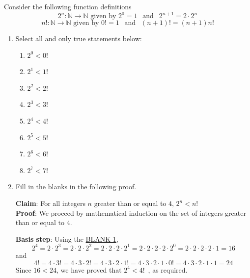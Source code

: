 \documentclass[12pt, oneside]{article}
\begin{document}
\begin{enumerate}
Consider the following function definitions
\[
    2^n: \mathbb{N} \to \mathbb{N} \text{ given by } 2^0 = 1 ~~\text{ and }~~
    2^{n+1} = 2 \cdot 2^n  
\]
\[
    n!: \mathbb{N} \to \mathbb{N} \text{ given by } 0! = 1 ~~\text{ and }~~
    (n+1)! = (n+1) n!
\]
\begin{enumerate}
\item Select all and only true statements below: 
    \begin{enumerate}
        \item $2^0 < 0!$
        \item $2^1 < 1!$
        \item $2^2 < 2!$
        \item $2^3 < 3!$
        \item $2^4 < 4!$
        \item $2^5 < 5!$
        \item $2^6 < 6!$
        \item $2^7 < 7!$
    \end{enumerate}

\item Fill in the blanks in the following proof.

{\bf Claim}: For all integers $n$ greater than or equal to $4$, $2^n < n!$ \\

{\bf Proof}: We proceed by mathematical induction on the set of integers greater than or equal to $4$.

{\bf Basis step}: Using the \underline{\hspace{0.2in}BLANK 1\hspace{0.2in}}, 
\[
    2^4 = 2 \cdot 2^3 = 2 \cdot 2 \cdot 2^2 = 2 \cdot 2 \cdot 2 \cdot 2^1 =
    2 \cdot 2 \cdot 2 \cdot 2 \cdot 2^0 =
    2 \cdot 2 \cdot 2 \cdot 2 \cdot 1 = 16 
\]
and
\[
    4! = 4 \cdot 3! = 4 \cdot 3 \cdot 2! 
    = 4 \cdot 3 \cdot 2 \cdot 1! = 4 \cdot 3 \cdot 2 \cdot 1 \cdot 0!
    = 4 \cdot 3 \cdot 2 \cdot 1 \cdot 1 = 24
\]
Since $16 < 24$, we have proved that $2^4 < 4!$~, as required.\\


\end{enumerate}
\end{enumerate}
\end{document}
